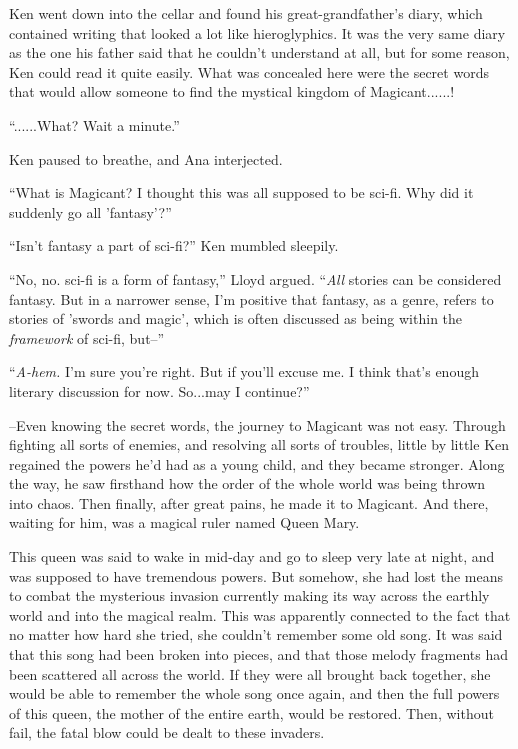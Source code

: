 \documentclass[
]{article}
\begin{document}
Ken went down into the cellar and found his great-grandfather's diary,
which contained writing that looked a lot like hieroglyphics. It was the
very same diary as the one his father said that he couldn't understand
at all, but for some reason, Ken could read it quite easily. What was
concealed here were the secret words that would allow someone to find
the mystical kingdom of Magicant......!

``......What? Wait a minute.''

Ken paused to breathe, and Ana interjected.

``What is Magicant? I thought this was all supposed to be sci-fi. Why
did it suddenly go all 'fantasy'?''

``Isn't fantasy a part of sci-fi?'' Ken mumbled sleepily.

``No, no. sci-fi is a form of fantasy,'' Lloyd argued. ``\emph{All}
stories can be considered fantasy. But in a narrower sense, I'm positive
that fantasy, as a genre, refers to stories of 'swords and magic', which
is often discussed as being within the \emph{framework} of sci-fi,
but--''

``\emph{A-hem.} I'm sure you're right. But if you'll excuse me. I think
that's enough literary discussion for now. So...may I continue?''

--Even knowing the secret words, the journey to Magicant was not easy.
Through fighting all sorts of enemies, and resolving all sorts of
troubles, little by little Ken regained the powers he'd had as a young
child, and they became stronger. Along the way, he saw firsthand how the
order of the whole world was being thrown into chaos. Then finally,
after great pains, he made it to Magicant. And there, waiting for him,
was a magical ruler named Queen Mary.

This queen was said to wake in mid-day and go to sleep very late at
night, and was supposed to have tremendous powers. But somehow, she had
lost the means to combat the mysterious invasion currently making its
way across the earthly world and into the magical realm. This was
apparently connected to the fact that no matter how hard she tried, she
couldn't remember some old song. It was said that this song had been
broken into pieces, and that those melody fragments had been scattered
all across the world. If they were all brought back together, she would
be able to remember the whole song once again, and then the full powers
of this queen, the mother of the entire earth, would be restored. Then,
without fail, the fatal blow could be dealt to these invaders.
\end{document}
